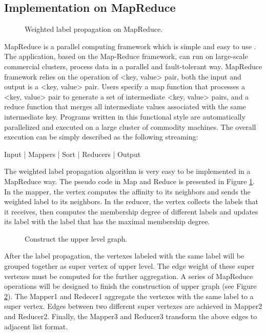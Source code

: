 \documentclass{acm_proc_article-sp}
\begin{document}
\subsection{Implementation on MapReduce}
\begin{figure}
\centering
{}
\caption{Weighted label propagation on MapReduce.}
\label{fig:wlp}
\end{figure}
MapReduce is a parallel computing framework which is simple and easy to use \cite{dean:mapreduce:}. The application, based on the Map-Reduce framework, can run on large-scale commercial clusters, process data in a parallel and fault-tolerant way. MapReduce framework relies on the operation of <key, value> pair, both the input and output is a <key, value> pair. Users specify a map function that processes a <key, value> pair to generate a set of intermediate <key, value> pairs, and a reduce function that merges all intermediate values associated with the same intermediate key. Programs written in this functional style are automatically parallelized and executed on a large cluster of commodity machines. The overall execution can be simply described as the following streaming:
\par
\begin{center}
Input | Mappers | Sort | Reducers | Output
\end{center}
\par
The weighted label propagation algorithm is very easy to be implemented in a MapReduce way. The pseudo code in Map and Reduce is presented in Figure \ref{fig:wlp}. In the mapper, the vertex computes the affinity to its neighbors and sends the weighted label to its neighbors. In the reducer, the vertex collects the labels that it receives, then computes the membership degree of different labels and updates its label with the label that has the maximal membership degree.
\begin{figure}
\centering
{}
\caption{Construct the upper level graph.}
\label{fig:upper}
\end{figure}


\par
After the label propagation, the vertexes labeled with the same label will be grouped together as super vertex of upper level. The edge weight of these super vertexes must be computed for the further aggregation. A series of MapReduce operations will be designed to finish the construction of upper graph (see Figure \ref{fig:upper}). The Mapper1 and Redecer1 aggregate the vertexes with the same label to a super vertex. Edges between two different super vertexes are achieved in Mapper2 and Reducer2. Finally, the Mapper3 and Reducer3 transform the above edges to adjacent list format.
\end{document}
